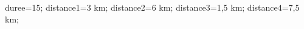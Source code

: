 \documentclass[exercice]{thedocument}%
\begin{document}
%
    \>duree=15;%
    \>distance1=3 km;%
    \>distance2=6 km;%
    \>distance3=1,5 km;%
    \>distance4=7,5 km;%
\end{document}
